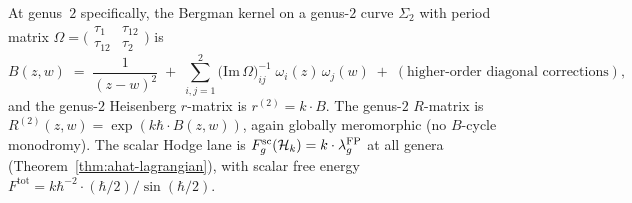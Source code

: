 \begin{computation}
At genus~$2$ specifically, the Bergman kernel on a genus-$2$ curve
$\Sigma_2$ with period matrix $\Omega = \bigl(\begin{smallmatrix}
\tau_1 & \tau_{12} \\ \tau_{12} & \tau_2
\end{smallmatrix}\bigr)$ is
\[
B(z,w)
\;=\;
\frac{1}{(z-w)^2}
\;+\;
\sum_{i,j=1}^{2}
\bigl(\mathrm{Im}\,\Omega\bigr)^{-1}_{ij}\;
\omega_i(z)\,\omega_j(w)
\;+\;
(\text{higher-order diagonal corrections}),
\]
and the genus-$2$ Heisenberg $r$-matrix is $r^{(2)} = k \cdot B$.
The genus-$2$ $R$-matrix is $R^{(2)}(z,w) = \exp(k\hbar\cdot B(z,w))$,
again globally meromorphic (no $B$-cycle monodromy). The scalar Hodge
lane is
$F_g^{\mathrm{sc}}(\mathcal{H}_k)=k \cdot \lambda_g^{\mathrm{FP}}$
at all genera (Theorem~\ref{thm:ahat-lagrangian}), with scalar free energy
$F^{\mathrm{tot}} = k\hbar^{-2}\cdot(\hbar/2)/\sin(\hbar/2)$.


\end{computation}
